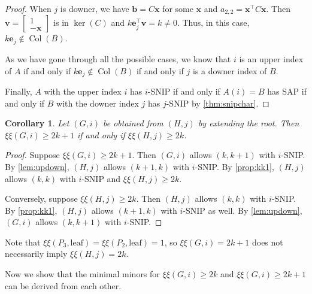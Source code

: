 \documentclass{article}
\newtheorem{corollary}[theorem]{Corollary}
\theoremstyle{definition}
\newcommand{\trans}{^\top}
\newcommand{\bb}{\mathbf{b}}
\newcommand{\be}{\mathbf{e}}
\newcommand{\bx}{\mathbf{x}}
\newcommand{\bv}{\mathbf{v}}
\newcommand{\Col}{\operatorname{Col}}
\newcommand{\excise}{\xi\xi}
\begin{document}
\begin{proof}
When $j$ is downer, we have $\bb = C\bx$ for some $\bx$ and $a_{2,2} = \bx\trans C\bx$.  Then $\bv = \begin{bmatrix} 1 \\ -\bx \end{bmatrix}$ is in $\ker(C)$ and $k\be_j\trans\bv = k \neq 0$.  Thus, in this case, $k\be_j\notin\Col(B)$.

As we have gone through all the possible cases, we know that $i$ is an upper index of $A$ if and only if $k\be_j\notin\Col(B)$ if and only if $j$ is a downer index of $B$.

Finally, $A$ with the upper index $i$ has $i$-SNIP if and only if $A(i) = B$ has SAP if and only if $B$ with the downer index $j$ has $j$-SNIP by \cref{thm:snipchar}.
\end{proof}

\begin{corollary}
\label{cor:updown}
Let $(G,i)$ be obtained from $(H,j)$ by extending the root.  Then $\excise(G,i) \geq 2k + 1$ if and only if $\excise(H,j) \geq 2k$.  
\end{corollary}
\begin{proof}
Suppose $\excise(G,i) \geq 2k + 1$.  Then $(G,i)$ allows $(k,k+1)$ with $i$-SNIP.  By \cref{lem:updown}, $(H,j)$ allows $(k+1,k)$ with $i$-SNIP.  By \cref{prop:kk1}, $(H,j)$ allows $(k,k)$ with $i$-SNIP and $\excise(H,j) \geq 2k$.  

Conversely, suppose $\excise(H,j) \geq 2k$.  Then $(H,j)$ allows $(k,k)$ with $i$-SNIP.  By \cref{prop:kk1}, $(H,j)$ allows $(k+1,k)$ with $i$-SNIP as well.  By \cref{lem:updown}, $(G,i)$ allows $(k,k+1)$ with $i$-SNIP.
\end{proof}

Note that $\excise(P_3, \text{leaf}) = \excise(P_2, \text{leaf}) = 1$, so $\excise(G,i) = 2k + 1$ does not necessarily imply $\excise(H,j) = 2k$.

Now we show that the minimal minors for $\excise(G, i) \geq 2k$ and $\excise(G, i) \geq 2k + 1$ can be derived from each other.
\end{document}
